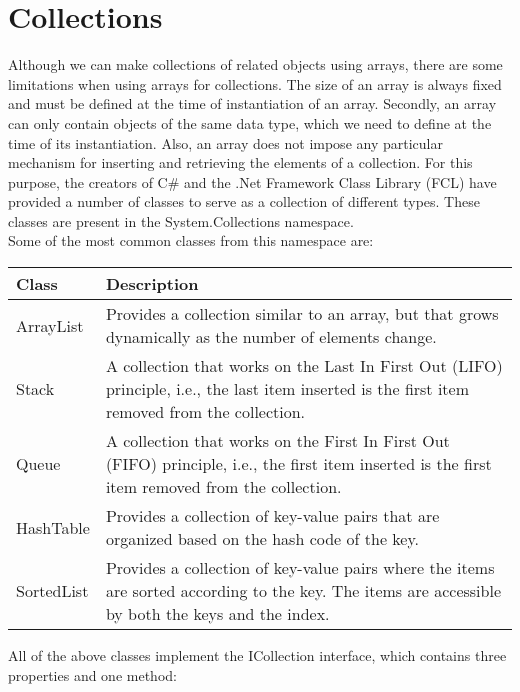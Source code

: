 \section{Collections}

Although we can make collections of related objects using arrays, there are some limitations when using arrays for
collections. The size of an array is always fixed and must be defined at the time of instantiation of an array.
Secondly, an array can only contain objects of the same data type, which we need to define at the time of its
instantiation. Also, an array does not impose any particular mechanism for inserting and retrieving the elements of
a collection. For this purpose, the creators of C\# and the .Net Framework Class Library (FCL) have provided a
number of classes to serve as a collection of different types. These classes are present in the System.Collections
namespace.\\

Some of the most common classes from this namespace are:

\begin{center}
    \begin{tabular}{ | m{5em} | m{10cm} | } 
    \hline
    Class & Description \\
    \hline
    ArrayList & Provides a collection similar to an array, but that grows dynamically as the number of
    elements change.\\
    Stack & A collection that works on the Last In First Out (LIFO) principle, i.e., the last item inserted is
    the first item removed from the collection.\\
    Queue & A collection that works on the First In First Out (FIFO) principle, i.e., the first item inserted
    is the first item removed from the collection.\\
    HashTable & Provides a collection of key-value pairs that are organized based on the hash code of the key.\\
    SortedList & Provides a collection of key-value pairs where the items are sorted according to the key. The
    items are accessible by both the keys and the index.\\
    \hline
    \end{tabular}
\end{center}

All of the above classes implement the ICollection interface, which contains three properties and one method:

